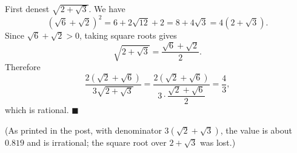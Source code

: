 First denest $\sqrt{2+\sqrt3}$. We have
\[\left(\sqrt6+\sqrt2\right)^2=6+2\sqrt{12}+2=8+4\sqrt3=4\left(2+\sqrt3\right).\]
Since $\sqrt6+\sqrt2>0$, taking square roots gives
\[\sqrt{2+\sqrt3}=\dfrac{\sqrt6+\sqrt2}{2}.\]
Therefore
\[\dfrac{2\left(\sqrt2+\sqrt6\right)}{3\sqrt{2+\sqrt3}}=\dfrac{2\left(\sqrt2+\sqrt6\right)}{3\cdot\dfrac{\sqrt2+\sqrt6}{2}}=\dfrac{4}{3},\]
which is rational. $\blacksquare$

(As printed in the post, with denominator $3\left(\sqrt2+\sqrt3\right)$, the value is about $0.819$ and is irrational; the square root over $2+\sqrt3$ was lost.)
